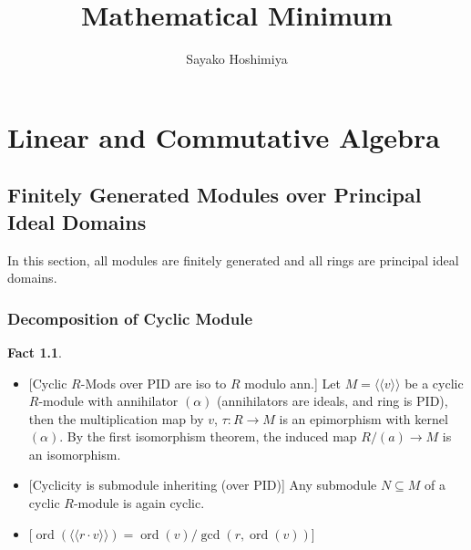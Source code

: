 \documentclass[10pt]{report}
\title{Mathematical Minimum}
\author{Sayako Hoshimiya}
\theoremstyle{definition}
\newtheorem{fact}{Fact}
\begin{document}
\maketitle
\renewcommand{\setminus}{\mathbin{\backslash}}

\chapter{Linear and Commutative Algebra}
\section{Finitely Generated Modules over Principal Ideal Domains}
In this section, all modules are finitely generated and all rings are principal ideal domains.

\subsection{Decomposition of Cyclic Module}
\begin{fact}\leavevmode
\begin{itemize}
\item {} [Cyclic $R$-Mods over PID are iso to $R$ modulo ann.]
Let $M=\langle\langle v\rangle\rangle$ be a cyclic $R$-module with annihilator $(\alpha)$ (annihilators are ideals, and ring is PID), then the multiplication map by $v$, $\tau:R\to M$ is an epimorphism with kernel $(\alpha)$. By the first isomorphism theorem, the induced map $R/(a)\to M$ is an isomorphism.
\item {} [Cyclicity is submodule inheriting (over PID)]
Any submodule $N\subseteq M$ of a cyclic $R$-module is again cyclic.
\item {} [$\operatorname{ord}(\langle\langle r\cdot v\rangle\rangle)=\operatorname{ord}(v)/\gcd(r,\operatorname{ord}(v))$]
\end{itemize}
\end{fact}
\end{document}
